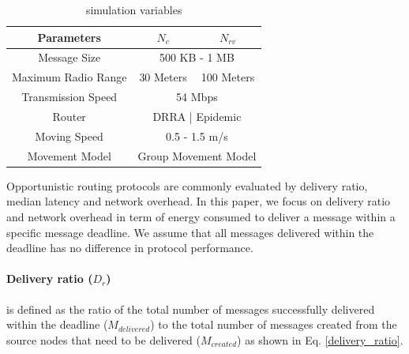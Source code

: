 \begin{table}[!t]
	\renewcommand{\arraystretch}{1.3}
	\caption{simulation variables}
	\label{table_parameters}
	\centering
	\begin{tabular}{|c|c|c|}
		\hline
		Parameters         &  $N_{c}$ & $N_{rv}$ \\ \hline
		Message Size       &  \multicolumn{2}{|c|}{500 KB - 1 MB}        \\ \hline
		Maximum Radio Range & 30 Meters  & 100 Meters \\ \hline
		Transmission Speed &  \multicolumn{2}{|c|}{ 54 Mbps   }        \\ \hline
		Router             & \multicolumn{2}{|c|}{ DRRA | Epidemic   } \\ \hline
		Moving Speed       &   \multicolumn{2}{|c|}{0.5 - 1.5 m/s }        \\ \hline
		Movement Model     &   \multicolumn{2}{|c|}{Group Movement Model  }      \\ \hline
	\end{tabular}
\end{table}

Opportunistic routing protocols are commonly evaluated by delivery ratio, median latency and network overhead.
In this paper, we focus on delivery ratio and network overhead in term of energy consumed to deliver a message within a specific message deadline.
We assume that all messages delivered within the deadline has no difference in protocol performance.


\paragraph{Delivery ratio ($D_{r}$)} is defined as the ratio of the total number of messages successfully delivered within the deadline ($ { M }_{ delivered }$) to the total number of messages created from the source nodes that need to be delivered ($ { M }_{ created }$) as shown in Eq. \ref{delivery_ratio}.


